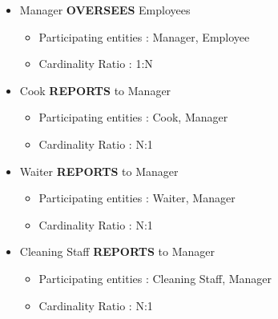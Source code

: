 \begin{itemize}
            \item Manager \textbf{OVERSEES} Employees
                \begin{itemize}[label=-]
                    \item Participating entities : Manager, Employee
                    \item Cardinality Ratio : 1:N
                \end{itemize}


            \item Cook \textbf{REPORTS} to Manager
                \begin{itemize}[label=-]
                    \item Participating entities : Cook, Manager
                    \item Cardinality Ratio : N:1
                \end{itemize}

            \item Waiter \textbf{REPORTS} to Manager
                \begin{itemize}[label=-]
                    \item Participating entities : Waiter, Manager
                    \item Cardinality Ratio : N:1
                \end{itemize}

            \item Cleaning Staff \textbf{REPORTS} to Manager
                \begin{itemize}[label=-]
                    \item Participating entities : Cleaning Staff, Manager
                    \item Cardinality Ratio : N:1
                \end{itemize}



\end{itemize}
